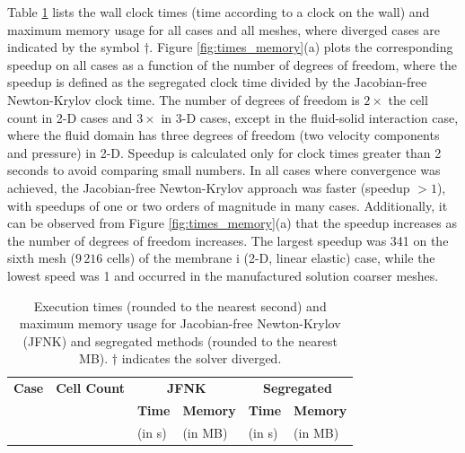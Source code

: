 \documentclass[sn-mathphys,Numbered]{sn-jnl}%
\begin{document}
Table \ref{tab:times_memory} lists the wall clock times (time according to a clock on the wall) and maximum memory usage for all cases and all meshes, where diverged cases are indicated by the symbol $\dag$.
Figure \ref{fig:times_memory}(a) plots the corresponding speedup on all cases as a function of the number of degrees of freedom, where the speedup is defined as the segregated clock time divided by the Jacobian-free Newton-Krylov clock time.
The number of degrees of freedom is $2 \times$ the cell count in 2-D cases and $3 \times$ in 3-D cases, except in the fluid-solid interaction case, where the fluid domain has three degrees of freedom (two velocity components and pressure) in 2-D.
Speedup is calculated only for clock times greater than 2 seconds to avoid comparing small numbers.
In all cases where convergence was achieved, the Jacobian-free Newton-Krylov approach was faster (speedup $> 1$), with speedups of one or two orders of magnitude in many cases.
Additionally, it can be observed from Figure \ref{fig:times_memory}(a) that the speedup increases as the number of degrees of freedom increases.
The largest speedup was 341 on the sixth mesh ($9\,216$ cells) of the membrane i (2-D, linear elastic) case, while the lowest speed was 1 and occurred in the manufactured solution coarser meshes.
\begin{table}[!htbp]
	\centering
		\begin{tabular}{ll|ll|ll}
			\hline
			\textbf{Case} & \textbf{Cell Count} & \multicolumn{2}{c|}{\textbf{JFNK}} & \multicolumn{2}{c}{\textbf{Segregated}} \\
			     &            & \textbf{Time} & \textbf{Memory} & \textbf{Time} & \textbf{Memory} \\
			     &            & (in s) & (in MB) & (in s) & (in MB) \\
			\hline
			
			
			
%			
			
			
			
			
			
%			
			
		\end{tabular}
	\caption{Execution times (rounded to the nearest second) and maximum memory usage for Jacobian-free Newton-Krylov (JFNK) and segregated methods (rounded to the nearest MB). $\dag$ indicates the solver diverged. }
	\label{tab:times_memory}
\end{table}
\end{document}
